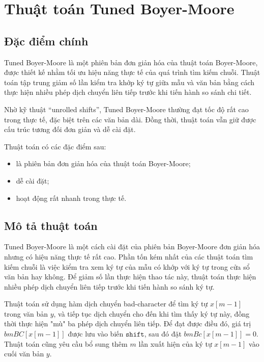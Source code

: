 \section{Thuật toán Tuned Boyer-Moore}

\subsection{Đặc điểm chính}

Tuned Boyer-Moore là một phiên bản đơn giản hóa của thuật toán Boyer-Moore, được thiết kế nhằm tối ưu hiệu năng thực tế của quá trình tìm kiếm chuỗi. Thuật toán tập trung giảm số lần kiểm tra khớp ký tự giữa mẫu và văn bản bằng cách thực hiện nhiều phép dịch chuyển liên tiếp trước khi tiến hành so sánh chi tiết.

Nhờ kỹ thuật “unrolled shifts”, Tuned Boyer-Moore thường đạt tốc độ rất cao trong thực tế, đặc biệt trên các văn bản dài. Đồng thời, thuật toán vẫn giữ được cấu trúc tương đối đơn giản và dễ cài đặt.

Thuật toán có các đặc điểm sau:

\begin{itemize}
    \item là phiên bản đơn giản hóa của thuật toán Boyer-Moore;
    \item dễ cài đặt;
    \item hoạt động rất nhanh trong thực tế.
\end{itemize}

\subsection{Mô tả thuật toán}

Tuned Boyer-Moore là một cách cài đặt của phiên bản Boyer-Moore đơn giản hóa nhưng có hiệu năng thực tế rất cao. Phần tốn kém nhất của các thuật toán tìm kiếm chuỗi là việc kiểm tra xem ký tự của mẫu có khớp với ký tự trong cửa sổ văn bản hay không. Để giảm số lần thực hiện thao tác này, thuật toán thực hiện nhiều phép dịch chuyển liên tiếp trước khi tiến hành so sánh ký tự.

Thuật toán sử dụng hàm dịch chuyển bad-character để tìm ký tự $x[m - 1]$ trong 
văn bản $y$, và tiếp tục dịch chuyển cho đến khi tìm thấy ký tự này, 
đồng thời thực hiện "mù" ba phép dịch chuyển liên tiếp. Để đạt được điều đó, 
giá trị $bmBC[x[m - 1]]$ được lưu vào biến $\texttt{shift}$, sau đó đặt $bmBc[x[m - 1]] = 0$. 
Thuật toán cũng yêu cầu bổ sung thêm $m$ lần xuất hiện của ký tự $x[m - 1]$ vào cuối 
văn bản $y$.

